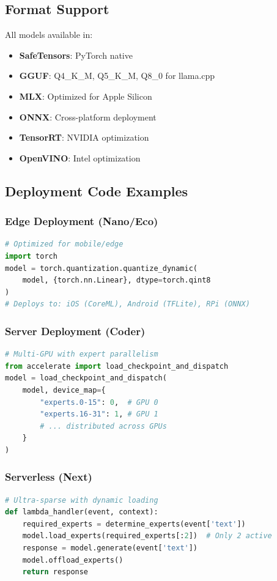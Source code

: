 \documentclass[11pt,a4paper]{article}
\begin{document}
\subsection{Format Support}

All models available in:
\begin{itemize}
    \item \textbf{SafeTensors}: PyTorch native
    \item \textbf{GGUF}: Q4\_K\_M, Q5\_K\_M, Q8\_0 for llama.cpp
    \item \textbf{MLX}: Optimized for Apple Silicon
    \item \textbf{ONNX}: Cross-platform deployment
    \item \textbf{TensorRT}: NVIDIA optimization
    \item \textbf{OpenVINO}: Intel optimization
\end{itemize}

\subsection{Deployment Code Examples}

\subsubsection{Edge Deployment (Nano/Eco)}
\begin{lstlisting}[language=Python]
# Optimized for mobile/edge
import torch
model = torch.quantization.quantize_dynamic(
    model, {torch.nn.Linear}, dtype=torch.qint8
)
# Deploys to: iOS (CoreML), Android (TFLite), RPi (ONNX)
\end{lstlisting}

\subsubsection{Server Deployment (Coder)}
\begin{lstlisting}[language=Python]
# Multi-GPU with expert parallelism
from accelerate import load_checkpoint_and_dispatch
model = load_checkpoint_and_dispatch(
    model, device_map={
        "experts.0-15": 0,  # GPU 0
        "experts.16-31": 1, # GPU 1
        # ... distributed across GPUs
    }
)
\end{lstlisting}

\subsubsection{Serverless (Next)}
\begin{lstlisting}[language=Python]
# Ultra-sparse with dynamic loading
def lambda_handler(event, context):
    required_experts = determine_experts(event['text'])
    model.load_experts(required_experts[:2])  # Only 2 active
    response = model.generate(event['text'])
    model.offload_experts()
    return response
\end{lstlisting}
\end{document}
